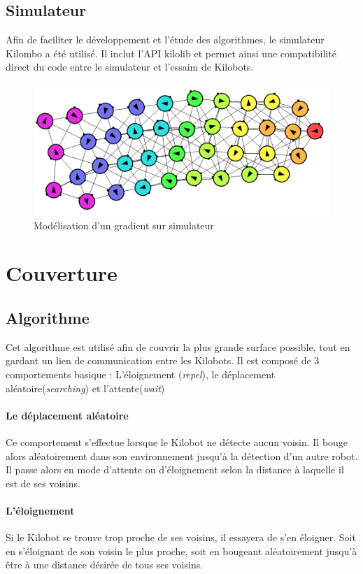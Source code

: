 \documentclass[a4paper]{article}
\begin{document}
\subsection{Simulateur}
Afin de faciliter le développement et l'étude des algorithmes, le simulateur Kilombo \cite{jansson_kilombo:_2015} a été utilisé. Il inclut l'API kilolib et permet ainsi une compatibilité direct du code entre le simulateur et l'essaim de Kilobots.
\begin{figure}[h!]
	\begin{center}
		\centering
		\includegraphics[width=0.8\linewidth]{../../script_results/gradient2-sim.png}
		\caption{Modélisation  d'un gradient sur simulateur}
	\end{center}
\end{figure} 
\newpage
\section{Couverture}
\subsection{Algorithme}
Cet algorithme est utilisé afin de couvrir la plus grande surface possible, tout en gardant un lien de communication entre les Kilobots.
Il est composé de 3 comportements basique : L'éloignement (\textit{repel}), le déplacement aléatoire(\textit{searching}) et l'attente(\textit{wait})
\paragraph{Le déplacement aléatoire} Ce comportement s'effectue lorsque le Kilobot ne détecte aucun voisin. Il bouge alors aléatoirement dans son environnement jusqu'à la détection d'un autre robot. Il passe alors en mode d'attente ou d'éloignement selon la distance à laquelle il est de ses voisins.
\paragraph{L'éloignement} Si le Kilobot se trouve trop proche de ses voisins, il essayera de s'en éloigner. Soit en s'éloignant de son voisin le plus proche, soit en bougeant aléatoirement jusqu'à être à une distance désirée de tous ses voisins.
\end{document}
